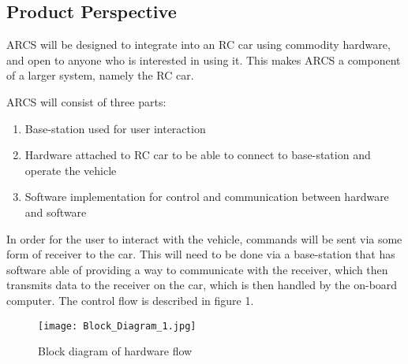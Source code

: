 \documentclass[compsoc,draftclsnofoot,onecolumn,10pt]{IEEEtran}
\begin{document}
\subsection{Product Perspective} %
ARCS will be designed to integrate into an RC car using commodity hardware, and open to anyone who is interested in using it. This 
makes ARCS a component of a larger system, namely the RC car. \par
ARCS will consist of three parts: 
\begin{enumerate}
	\item Base-station used for user interaction
	\item Hardware attached to RC car to be able to connect to base-station and 
		operate the vehicle
	\item Software implementation for control and communication between hardware and software
\end{enumerate}
In order for the user to interact with the vehicle, commands will be sent via some form
of receiver to the car. This will need to be done via a base-station that has software able of
providing a way to communicate with the receiver, which then transmits data to the receiver on 
the car, which is then handled by the on-board computer. 
The control flow is described in figure 1. \\

\begin{figure}
  \centering
 \texttt{[image: Block\_Diagram\_1.jpg]}
  \caption{Block diagram of hardware flow}
\end{figure}
\end{document}
